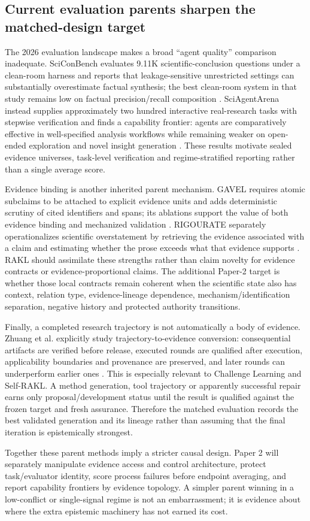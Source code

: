 \subsection{Current evaluation parents sharpen the matched-design target}

The 2026 evaluation landscape makes a broad ``agent quality'' comparison inadequate. SciConBench evaluates 9.11K scientific-conclusion questions under a clean-room harness and reports that leakage-sensitive unrestricted settings can substantially overestimate factual synthesis; the best clean-room system in that study remains low on factual precision/recall composition \cite{jung2026scicon}. SciAgentArena instead supplies approximately two hundred interactive real-research tasks with stepwise verification and finds a capability frontier: agents are comparatively effective in well-specified analysis workflows while remaining weaker on open-ended exploration and novel insight generation \cite{liu2026sciagentarena}. These results motivate sealed evidence universes, task-level verification and regime-stratified reporting rather than a single average score.

Evidence binding is another inherited parent mechanism. GAVEL requires atomic subclaims to be attached to explicit evidence units and adds deterministic scrutiny of cited identifiers and spans; its ablations support the value of both evidence binding and mechanized validation \cite{xu2026gavel}. RIGOURATE separately operationalizes scientific overstatement by retrieving the evidence associated with a claim and estimating whether the prose exceeds what that evidence supports \cite{james2026rigourate}. RAKL should assimilate these strengths rather than claim novelty for evidence contracts or evidence-proportional claims. The additional Paper-2 target is whether those local contracts remain coherent when the scientific state also has context, relation type, evidence-lineage dependence, mechanism/identification separation, negative history and protected authority transitions.

Finally, a completed research trajectory is not automatically a body of evidence. Zhuang et al. explicitly study trajectory-to-evidence conversion: consequential artifacts are verified before release, executed rounds are qualified after execution, applicability boundaries and provenance are preserved, and later rounds can underperform earlier ones \cite{zhuang2026trajectory}. This is especially relevant to Challenge Learning and Self-RAKL. A method generation, tool trajectory or apparently successful repair earns only proposal/development status until the result is qualified against the frozen target and fresh assurance. Therefore the matched evaluation records the best validated generation and its lineage rather than assuming that the final iteration is epistemically strongest.

Together these parent methods imply a stricter causal design. Paper 2 will separately manipulate evidence access and control architecture, protect task/evaluator identity, score process failures before endpoint averaging, and report capability frontiers by evidence topology. A simpler parent winning in a low-conflict or single-signal regime is not an embarrassment; it is evidence about where the extra epistemic machinery has not earned its cost.
